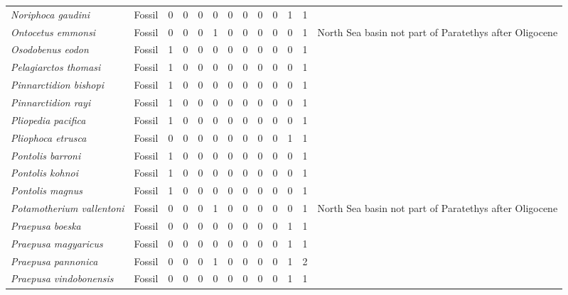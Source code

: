 \begin{longtable}{llccccccccccp{}}
\textit{Noriphoca gaudini} &
Fossil &
0 &
0 &
0 &
0 &
0 &
0 &
0 & 
0 &
1 &
1 &
\\

\textit{Ontocetus emmonsi} &
Fossil &
0 &
0 &
0 &
1 &
0 &
0 &
0 &
0 &
0 &
1 &
North Sea basin not part of Paratethys after Oligocene\\

\textit{Osodobenus eodon} &
Fossil &
1 &
0 &
0 &
0 &
0 &
0 &
0 &
0 &
0 &
1 &
\\

\textit{Pelagiarctos thomasi} &
Fossil &
1 &
0 &
0 &
0 &
0 &
0 &
0 &
0 &
0 &
1 &
\\

\textit{Pinnarctidion bishopi} &
Fossil &
1 &
0 &
0 &
0 &
0 &
0 &
0 &
0 &
0 &
1 &
\\

\textit{Pinnarctidion rayi} &
Fossil &
1 &
0 &
0 &
0 &
0 &
0 &
0 &
0 &
0 &
1 &
\\

\textit{Pliopedia pacifica} &
Fossil &
1 &
0 &
0 &
0 &
0 &
0 &
0 &
0 &
0 &
1 &
\\

\textit{Pliophoca etrusca} &
Fossil &
0 &
0 &
0 &
0 &
0 &
0 &
0 &
0 &
1 &
1 &
\\

\textit{Pontolis barroni} &
Fossil &
1 &
0 &
0 &
0 &
0 &
0 &
0 &
0 &
0 &
1 &
\\

\textit{Pontolis kohnoi} &
Fossil &
1 &
0 &
0 &
0 &
0 &
0 &
0 &
0 &
0 &
1 &
\\

\textit{Pontolis magnus} &
Fossil &
1 &
0 &
0 &
0 &
0 &
0 &
0 &
0 &
0 &
1 &
\\

\textit{Potamotherium vallentoni} &
Fossil &
0 &
0 &
0 &
1 &
0 &
0 &
0 &
0 &
0 &
1 &
North Sea basin not part of Paratethys after Oligocene\\

\textit{Praepusa boeska} &
Fossil &
0 &
0 &
0 &
0 &
0 &
0 &
0 &
0 &
1 &
1 &
\\

\textit{Praepusa magyaricus} &
Fossil &
0 &
0 &
0 &
0 &
0 &
0 &
0 &
0 &
1 &
1 &
\\

\textit{Praepusa pannonica} &
Fossil &
0 &
0 &
0 &
1 &
0 &
0 &
0 &
0 &
1 &
2 &
\\

\textit{Praepusa vindobonensis} &
Fossil &
0 &
0 &
0 &
0 &
0 &
0 &
0 &
0 &
1 &
1 &
\\


\end{longtable}
